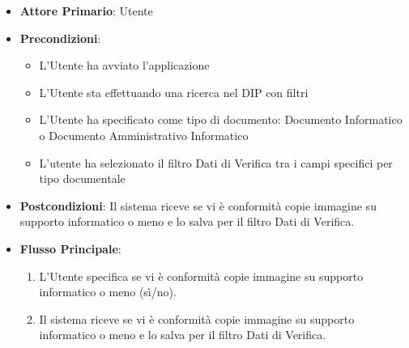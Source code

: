 \label{addValoreConformitaCopieImmagine}
\begin{itemize}
      \item \textbf{Attore Primario}: Utente
      \item \textbf{Precondizioni}: 
      \begin{itemize}
            \item L'Utente ha avviato l'applicazione
            \item L'Utente sta effettuando una ricerca nel DIP con filtri
            \item L'Utente ha specificato come tipo di documento: Documento Informatico o Documento Amministrativo Informatico
            \item L'utente ha selezionato il filtro Dati di Verifica tra i campi specifici per tipo documentale
      \end{itemize}
      \item \textbf{Postcondizioni}: Il sistema riceve se vi è conformità copie immagine su supporto informatico o meno e lo salva per il filtro Dati di Verifica.
      \item \textbf{Flusso Principale}:
      \begin{enumerate}
            \item L'Utente specifica se vi è conformità copie immagine su supporto informatico o meno (sì/no).
            \item Il sistema riceve se vi è conformità copie immagine su supporto informatico o meno e lo salva per il filtro Dati di Verifica.
      \end{enumerate}
\end{itemize}

